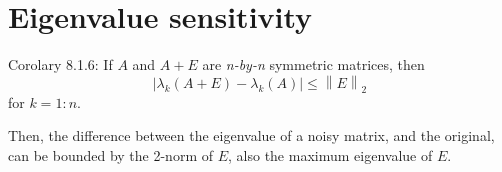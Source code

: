 \documentclass[11pt,a4paper]{article}
\newcommand{\norm}[1]{\left\lVert#1\right\rVert}
\begin{document}
\section{Eigenvalue sensitivity}


Corolary 8.1.6: If $A$ and $A+E$ are \textit{n-by-n} symmetric matrices, then
%
$$ |\lambda_k(A+E) - \lambda_k(A)| \le \norm{E}_2 $$
%
for $k = 1:n$.

Then, the difference between the eigenvalue of a noisy matrix, and the original, 
can be bounded by the 2-norm of $E$, also the maximum eigenvalue of $E$.
\end{document}
